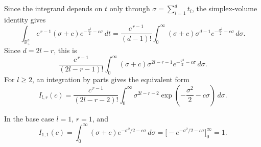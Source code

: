 \documentclass[11pt]{article}
\DeclareMathOperator{\RR}{\mathbb{R}}
\begin{document}
Since the integrand depends on \(t\) only through
\(\sigma=\sum_{i=1}^d t_i\), the simplex-volume identity gives
\[
\int_{\RR_+^d}
c^{\,r-1}(\sigma+c)
e^{-\frac{\sigma^2}{2}-c\sigma}
\,dt
=
\frac{c^{\,r-1}}{(d-1)!}
\int_0^\infty
(\sigma+c)\sigma^{d-1}
e^{-\frac{\sigma^2}{2}-c\sigma}
\,d\sigma.
\]
Since \(d=2l-r\), this is
\[
\frac{c^{\,r-1}}{(2l-r-1)!}
\int_0^\infty
(\sigma+c)\sigma^{2l-r-1}
e^{-\frac{\sigma^2}{2}-c\sigma}
\,d\sigma.
\]
For \(l\ge2\), an integration by parts gives the equivalent form
\[
I_{l,r}(c)
=
\frac{c^{\,r-1}}{(2l-r-2)!}
\int_0^\infty
\sigma^{2l-r-2}
\exp\!\left(-\frac{\sigma^2}{2}-c\sigma\right)\,d\sigma.
\]

%
%
In the base case $l=1$, $r=1$, and
\[
I_{1,1}(c)=\int_0^\infty (\sigma+c)e^{-\sigma^2/2-c\sigma}\,d\sigma
=
\Big[-e^{-\sigma^2/2-c\sigma}\Big]_{0}^{\infty}=1.
\]
\end{document}
